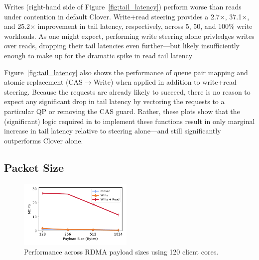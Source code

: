 
Writes (right-hand side of Figure~\ref{fig:tail_latency}) perform
worse than reads under contention in default Clover. Write+read
steering provides a 2.7$\times$, 37.1$\times$, and 25.2$\times$
improvement in tail latency, respectively, across 5, 50, and 100\%
write workloads.  As one might expect, performing write steering alone
privledges writes over reads, dropping their tail latencies even
further---but likely insufficiently enough to make up for the dramatic
spike in read tail latency

Figure~\ref{fig:tail_latency} also shows the performance of queue pair
mapping and atomic replacement (CAS$\rightarrow$Write) when applied in addition
to write+read steering.  Because the requests are already likely to
succeed, there is no reason to expect any significant drop in tail
latency by vectoring the requests to a particular QP or removing the
CAS guard.  Rather, these plots show that the (significant) 
logic required in {\sword} to implement these functions result in only
marginal increase in tail latency relative to steering alone---and still
significantly outperforms Clover alone.

\subsection{Packet Size}

\begin{figure}
  \centering
  \includegraphics[width=0.485\textwidth]{fig/packet_size.pdf}

    \caption{Performance across RDMA payload sizes using 120 client cores.
    }

    \label{fig:packet_size}
\end{figure}

